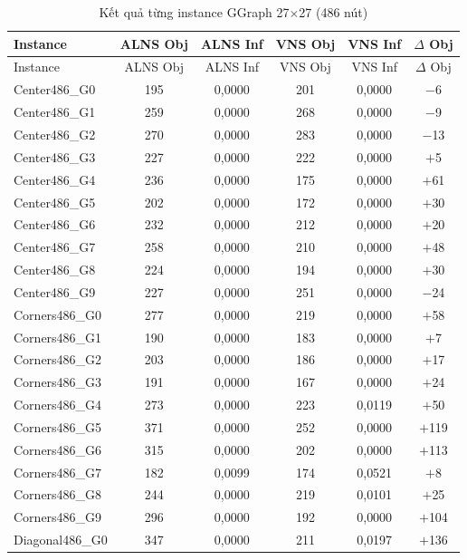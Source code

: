 \documentclass[12pt, a4paper]{article}
\begin{document}
\begin{longtable}{lccccc}
  \caption{Kết quả từng instance GGraph 27$\times$27 (486 nút)} \\
  \toprule
  Instance & ALNS Obj & ALNS Inf & VNS Obj & VNS Inf & $\Delta$ Obj \\
  \midrule
  \endfirsthead
  \toprule
  Instance & ALNS Obj & ALNS Inf & VNS Obj & VNS Inf & $\Delta$ Obj \\
  \midrule
  \endhead
  \bottomrule
  \endfoot
  Center486\_G0 & 195 & 0{,}0000 & 201 & 0{,}0000 & $-$6 \\
  Center486\_G1 & 259 & 0{,}0000 & 268 & 0{,}0000 & $-$9 \\
  Center486\_G2 & 270 & 0{,}0000 & 283 & 0{,}0000 & $-$13 \\
  Center486\_G3 & 227 & 0{,}0000 & 222 & 0{,}0000 & $+$5 \\
  Center486\_G4 & 236 & 0{,}0000 & 175 & 0{,}0000 & $+$61 \\
  Center486\_G5 & 202 & 0{,}0000 & 172 & 0{,}0000 & $+$30 \\
  Center486\_G6 & 232 & 0{,}0000 & 212 & 0{,}0000 & $+$20 \\
  Center486\_G7 & 258 & 0{,}0000 & 210 & 0{,}0000 & $+$48 \\
  Center486\_G8 & 224 & 0{,}0000 & 194 & 0{,}0000 & $+$30 \\
  Center486\_G9 & 227 & 0{,}0000 & 251 & 0{,}0000 & $-$24 \\
  \midrule
  Corners486\_G0  & 277 & 0{,}0000 & 219 & 0{,}0000 & $+$58 \\
  Corners486\_G1  & 190 & 0{,}0000 & 183 & 0{,}0000 & $+$7 \\
  Corners486\_G2  & 203 & 0{,}0000 & 186 & 0{,}0000 & $+$17 \\
  Corners486\_G3  & 191 & 0{,}0000 & 167 & 0{,}0000 & $+$24 \\
  Corners486\_G4  & 273 & 0{,}0000 & 223 & 0{,}0119 & $+$50 \\
  Corners486\_G5  & 371 & 0{,}0000 & 252 & 0{,}0000 & $+$119 \\
  Corners486\_G6  & 315 & 0{,}0000 & 202 & 0{,}0000 & $+$113 \\
  Corners486\_G7  & 182 & 0{,}0099 & 174 & 0{,}0521 & $+$8 \\
  Corners486\_G8  & 244 & 0{,}0000 & 219 & 0{,}0101 & $+$25 \\
  Corners486\_G9  & 296 & 0{,}0000 & 192 & 0{,}0000 & $+$104 \\
  \midrule
  Diagonal486\_G0 & 347 & 0{,}0000 & 211 & 0{,}0197 & $+$136 \\

\end{longtable}
\end{document}
